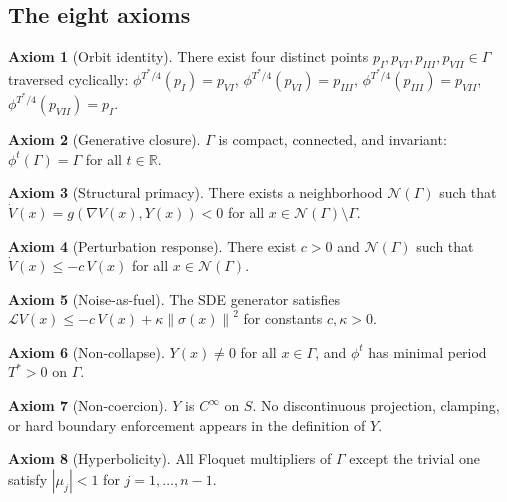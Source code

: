 \documentclass[12pt, oneside]{book}
\theoremstyle{plain}
\theoremstyle{definition}
\newtheorem{axiom}{Axiom}
\theoremstyle{remark}
\newcommand{\R}{\mathbb{R}}
\newcommand{\Orb}{\Gamma}
\newcommand{\cN}{\mathcal{N}}
\newcommand{\cL}{\mathcal{L}}
\newcommand{\norm}[1]{\left\|#1\right\|}
\newcommand{\abs}[1]{\left|#1\right|}
\begin{document}
\subsection{The eight axioms}\label{subsec:axioms}

\begin{axiom}[Orbit identity]\label{ax:orbit}
There exist four distinct points $p_I,p_{VI},p_{III},p_{VII}\in\Orb$
traversed cyclically:
$\phi^{T^*/4}(p_I)=p_{VI}$, $\phi^{T^*/4}(p_{VI})=p_{III}$,
$\phi^{T^*/4}(p_{III})=p_{VII}$, $\phi^{T^*/4}(p_{VII})=p_I$.
\end{axiom}

\begin{axiom}[Generative closure]\label{ax:closure}
$\Orb$ is compact, connected, and invariant:
$\phi^t(\Orb)=\Orb$ for all $t\in\R$.
\end{axiom}

\begin{axiom}[Structural primacy]\label{ax:primacy}
There exists a neighborhood $\cN(\Orb)$ such that
$\dot V(x)=g(\nabla V(x),Y(x))<0$ for all $x\in\cN(\Orb)\setminus\Orb$.
\end{axiom}

\begin{axiom}[Perturbation response]\label{ax:response}
There exist $c>0$ and $\cN(\Orb)$ such that
$\dot V(x)\le -c\,V(x)$ for all $x\in\cN(\Orb)$.
\end{axiom}

\begin{axiom}[Noise-as-fuel]\label{ax:noise}
The SDE generator satisfies
$\cL V(x)\le -c\,V(x)+\kappa\norm{\sigma(x)}^2$
for constants $c,\kappa>0$.
\end{axiom}

\begin{axiom}[Non-collapse]\label{ax:noncollapse}
$Y(x)\ne 0$ for all $x\in\Orb$, and $\phi^t$ has minimal period
$T^*>0$ on $\Orb$.
\end{axiom}

\begin{axiom}[Non-coercion]\label{ax:smooth}
$Y$ is $C^\infty$ on $S$. No discontinuous projection, clamping,
or hard boundary enforcement appears in the definition of $Y$.
\end{axiom}

\begin{axiom}[Hyperbolicity]\label{ax:hyperbolic}
All Floquet multipliers of $\Orb$ except the trivial one satisfy
$\abs{\mu_j}<1$ for $j=1,\ldots,n-1$.
\end{axiom}
\end{document}
